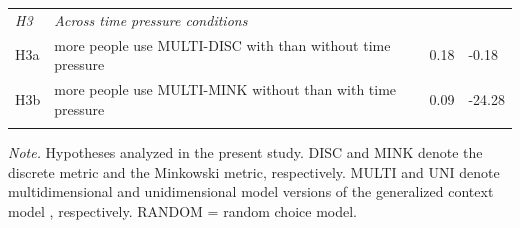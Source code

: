 \documentclass[a4paper,man,natbib]{apa6}
\begin{document}
\begin{table}
\begin{center}
\begin{threeparttable}
\begin{tabular*}{\textwidth}{lp{55mm}p{100mm}ll}
\midrule
\multicolumn{1}{l}{\emph{H3}} & \multicolumn{1}{l}{\emph{Across time pressure conditions}} \\
\addlinespace
H3a & \multicolumn{2}{p{150mm}}{more people use MULTI-DISC with than without time pressure} & 0.18 & -0.18\\
\addlinespace
H3b & \multicolumn{2}{p{150mm}}{more people use MULTI-MINK without than with time pressure} & 0.09 & -24.28\\
\bottomrule
\addlinespace
\end{tabular*}
\begin{tablenotes}[para]
\textit{Note.} Hypotheses analyzed in the present study. DISC and MINK denote the discrete metric and the Minkowski metric, respectively. MULTI and UNI denote multidimensional and unidimensional model versions of the generalized context model \citep{nosofsky1989further}, respectively. RANDOM = random choice model.
\end{tablenotes}
\end{threeparttable}
\end{center}
\end{table}
\vspace{8mm}
\end{document}
